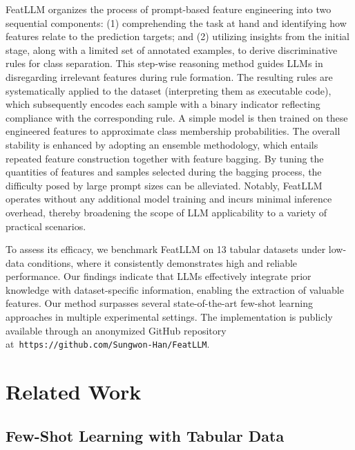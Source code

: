 \textsf{FeatLLM} organizes the process of prompt-based feature engineering into two sequential components: (1) comprehending the task at hand and identifying how features relate to the prediction targets; and (2) utilizing insights from the initial stage, along with a limited set of annotated examples, to derive discriminative rules for class separation. This step-wise reasoning method guides LLMs in disregarding irrelevant features during rule formation. The resulting rules are systematically applied to the dataset (interpreting them as executable code), which subsequently encodes each sample with a binary indicator reflecting compliance with the corresponding rule. A simple model is then trained on these engineered features to approximate class membership probabilities. The overall stability is enhanced by adopting an ensemble methodology, which entails repeated feature construction together with feature bagging. By tuning the quantities of features and samples selected during the bagging process, the difficulty posed by large prompt sizes can be alleviated. Notably, \textsf{FeatLLM} operates without any additional model training and incurs minimal inference overhead, thereby broadening the scope of LLM applicability to a variety of practical scenarios.

To assess its efficacy, we benchmark \textsf{FeatLLM} on 13 tabular datasets under low-data conditions, where it consistently demonstrates high and reliable performance. Our findings indicate that LLMs effectively integrate prior knowledge with dataset-specific information, enabling the extraction of valuable features. Our method surpasses several state-of-the-art few-shot learning approaches in multiple experimental settings. The implementation is publicly available through an anonymized GitHub repository at~\texttt{https://github.com/Sungwon-Han/FeatLLM}.

\section{Related Work}

\subsection{Few-Shot Learning with Tabular Data} 

